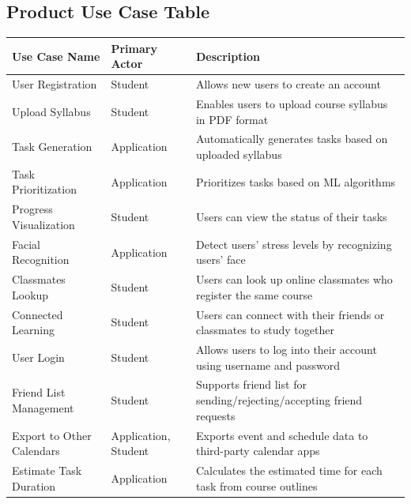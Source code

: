 \documentclass[12pt]{article}
\begin{document}
\subsection{Product Use Case Table}
\begin{longtable}{ |p{3cm}|p{5cm}|p{5cm}|}
    \hline
    Use Case Name & Primary Actor & Description \\
    \hline
    User Registration & Student & Allows new users to create an account \\
    \hline
    Upload Syllabus & Student & Enables users to upload course syllabus in PDF format \\
    \hline
    Task Generation & Application & Automatically generates tasks based on uploaded syllabus \\
    \hline
    Task Prioritization & Application & Prioritizes tasks based on ML algorithms \\
    \hline
    Progress Visualization & Student & Users can view the status of their tasks \\
    \hline
    Facial Recognition & Application & Detect users' stress levels by recognizing users' face \\
    \hline
    Classmates Lookup & Student & Users can look up online classmates who register the same course \\
    \hline
    Connected Learning & Student & Users can connect with their friends or classmates to study together \\
    \hline
    User Login & Student & Allows users to log into their account using username and password \\
    \hline
    Friend List Management & Student & Supports friend list for sending/rejecting/accepting friend requests \\
    \hline
    Export to Other Calendars & Application, Student & Exports event and schedule data to third-party calendar apps \\
    \hline
    Estimate Task Duration & Application & Calculates the estimated time for each task from course outlines \\
    \hline
\end{longtable}
\end{document}
